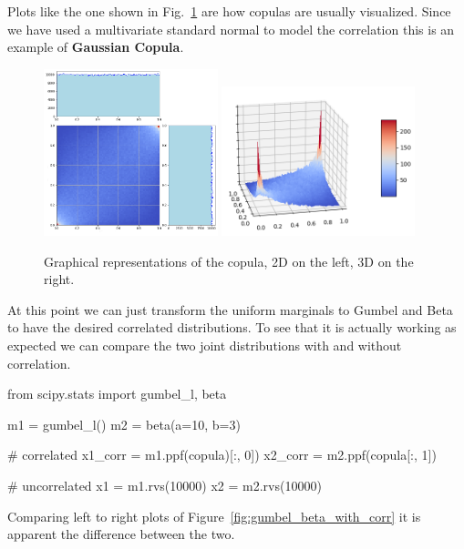 Plots like the one shown in Fig.~\ref{fig:copula} are how copulas are usually visualized. Since we have used a multivariate standard normal to model the correlation this is an example of \textbf{Gaussian Copula}.

\begin{figure}[htbp]
\centering
\includegraphics[width=0.45\textwidth]{figures/copula_2d}
\quad
\includegraphics[width=0.5\textwidth]{figures/copula_3d}
\caption{Graphical representations of the copula, 2D on the left, 3D on the right.}
\label{fig:copula}
\end{figure}

At this point we can just transform the uniform marginals to Gumbel and Beta to have the desired correlated distributions.
To see that it is actually working as expected we can compare the two joint distributions with and without correlation.

\begin{ipython}
from scipy.stats import gumbel_l, beta

m1 = gumbel_l()
m2 = beta(a=10, b=3)

# correlated 
x1_corr = m1.ppf(copula)[:, 0])
x2_corr = m2.ppf(copula[:, 1])

# uncorrelated
x1 = m1.rvs(10000)
x2 = m2.rvs(10000)
\end{ipython}

Comparing left to right plots of Figure~\ref{fig:gumbel_beta_with_corr} it is apparent the difference between the two.

